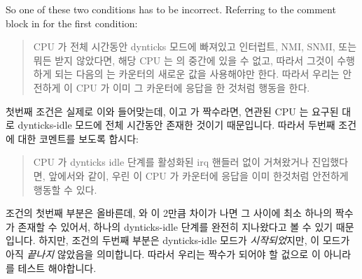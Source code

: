 So one of these two conditions has to be incorrect.
Referring to the comment block in 
for the first condition:
\fi

\begin{quote}
	CPU 가 전체 시간동안 dynticks 모드에 빠져있고 인터럽트, NMI, SNMI, 또는
	뭐든 받지 않았다면, 해당 CPU 는  의 중간에 있을 수
	없고, 따라서 그것이 수행하게 되는 다음의  는
	카운터의 새로운 값을 사용해야만 한다.  따라서 우리는 안전하게 이 CPU 가
	이미 그 카운터에 응답을 한 것처럼 행동을 한다.
	\iffalse

	If the CPU remained in dynticks mode for the entire time
	and didn't take any interrupts, NMIs, SMIs, or whatever,
	then it cannot be in the middle of an \co{rcu_read_lock()}, so
	the next \co{rcu_read_lock()} it executes must use the new value
	of the counter.  So we can safely pretend that this CPU
	already acknowledged the counter.
	\fi
\end{quote}

첫번째 조건은 실제로 이와 들어맞는데,  이고  가
짝수라면, 연관된 CPU 는 요구된 대로 dynticks-idle 모드에 전체 시간동안 존재한
것이기 때문입니다.
따라서 두번째 조건에 대한 코멘트를 보도록 합시다:
\iffalse

The first condition does match this, because if \co{curr == snap}
and if \co{curr} is even, then the corresponding CPU has been
in dynticks-idle mode the entire time, as required.
So let's look at the comment block for the second condition:
\fi

\begin{quote}
	CPU 가 dynticks idle 단계를 활성화된 irq 핸들러 없이 거쳐왔거나
	진입했다면, 앞에서와 같이, 우린 이 CPU 가 카운터에 응답을 이미 한것처럼
	안전하게 행동할 수 있다.
	\iffalse

	If the CPU passed through or entered a dynticks idle phase with
	no active irq handlers, then, as above, we can safely pretend
	that this CPU already acknowledged the counter.
	\fi
\end{quote}

조건의 첫번째 부분은 올바른데,  와  이 2만큼 차이가 나면 그
사이에 최소 하나의 짝수가 존재할 수 있어서, 하나의 dynticks-idle 단계를 완전히
지나왔다고 볼 수 있기 때문입니다.
하지만, 조건의 두번째 부분은 dynticks-idle 모드가 \emph{시작되었}지만, 이
모드가 아직 \emph{끝나지} 않았음을 의미합니다.
따라서 우리는 짝수가 되어야 할 겂으로  이 아니라  를 테스트
해야합니다.

